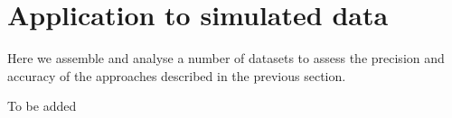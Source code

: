 \documentclass{aastex63}
\begin{document}




\section{Application to simulated data} 
\label{sec:simulations}

Here we assemble and analyse a number of datasets to assess the precision and accuracy of the approaches described in the previous section.

\acknowledgments

To be added

%
\end{document}

